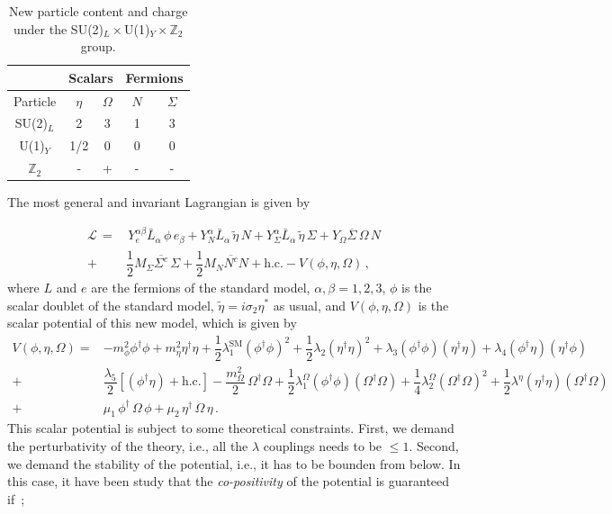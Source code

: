 \documentclass[12pt,letterpaper]{article}
\begin{document}
   
\begin{table}
\centering
\begin{tabular}{|c|c|c|c|c|}
\hline
 \multicolumn{1}{|c}{   }  &
 \multicolumn{2}{|c}{ Scalars  } &
  \multicolumn{2}{|c|}{ Fermions  }  \\
 \hline 
Particle & $\eta$ & $\Omega$ & $N$ & $\Sigma$\\
\hline
SU(2)$_L$ &2 &3 &1 &3\\
U(1)$_Y$ &1/2 &0 &0 &0\\
$\mathbb{Z}_2$ & - &+ &- &-\\
\hline
\end{tabular}
\caption{New particle content and charge under the SU(2)$_L\times
$U(1)$_Y\times\mathbb{Z}_2$ group.}
\label{tab:new-particle-content}
\end{table}


The most general and invariant Lagrangian is given by

\begin{align}
\label{eq:full-lagrangian}
\mathcal{L}\, = &\, Y_e^{\alpha\beta}\bar{L}_{\alpha}\,\phi\, e_{\beta}
+  Y_N^{\alpha}\bar{L}_{\alpha}\,\tilde{\eta}\, N 
+  Y_{\Sigma}^{\alpha}\bar{L}_{\alpha}\,\tilde{\eta}\, \Sigma 
+  Y_{\Omega}\overline{\Sigma}\,\Omega\, N\nonumber \\
+& \dfrac{1}{2}M_{\Sigma}\overline{\Sigma^c}\,\Sigma
+ \dfrac{1}{2}M_{N}\overline{N^c}N + \text{h.c.} - V(\phi,\eta, \Omega)\,,
\end{align}
%
where $L$ and $e$ are the fermions of the standard model, $\alpha,\beta=1,2,3$, $\phi$ is the scalar doublet of the standard model, $\tilde{\eta}=i\sigma_2\eta^*$ as usual, and $V(\phi,\eta, \Omega)$ is the scalar potential of this new model, which is given by
%
\begin{align}
\label{eq:scalar-potential}
V(\phi,\eta, \Omega) = &
-m_{\phi}^2 \phi^{\dagger}\phi + m_{\eta}^2 \eta^{\dagger}\eta
+\dfrac{1}{2}\lambda_1^{\text{SM}} (\phi^{\dagger}\phi)^2
+\dfrac{1}{2}\lambda_2 (\eta^{\dagger}\eta)^2
+\lambda_3 (\phi^{\dagger}\phi)(\eta^{\dagger}\eta)
+\lambda_4 (\phi^{\dagger}\eta)(\eta^{\dagger}\phi) \nonumber \\
+& \dfrac{\lambda_5}{2}\left[(\phi^{\dagger}\eta) + \text{h.c.}\right]
-\dfrac{m_{\Omega}^2}{2}\,\Omega^{\dagger}\Omega
+\dfrac{1}{2}\lambda_1^{\Omega} (\phi^{\dagger}\phi)(\Omega^{\dagger}\Omega)
+\dfrac{1}{4}\lambda_2^{\Omega} (\Omega^{\dagger}\Omega)^2
+\dfrac{1}{2}\lambda^{\eta} (\eta^{\dagger}\eta)(\Omega^{\dagger}\Omega)\nonumber \\
+& \mu_1\,\phi^{\dagger}\,\Omega\,\phi + \mu_2\,\eta^{\dagger}\,\Omega\,\eta\,.
\end{align}
%
This scalar potential is subject to some theoretical constraints. First, we demand the perturbativity of the theory, i.e., all the $\lambda$ couplings needs to be $\leq 1$. Second, we demand the stability of the potential, i.e., it has to be bounden from below. In this case, it have been study that the \textit{co-positivity} of the potential is guaranteed if~\cite{Merle:2016scw};
\end{document}
